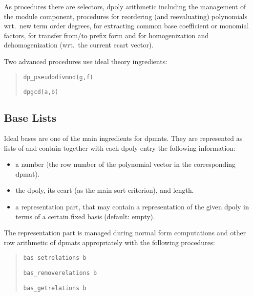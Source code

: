 As procedures there are selectors, dpoly arithmetic including the management
of the module component, procedures for reordering (and reevaluating)
polynomials wrt.\ new term order degrees, for extracting common base
coefficient or monomial factors, for transfer from/to prefix form and for
homogenization and dehomogenization (wrt.\ the current ecart vector).

Two advanced procedures use ideal theory ingredients:
\begin{quote}
\verb|dp_pseudodivmod(g,f)|


\verb|dpgcd(a,b)| 

\end{quote}


\subsection{Base Lists}

Ideal bases are one of the main ingredients for dpmats. They are
represented as lists of  and contain together with
each dpoly entry the following information:
\begin{itemize}
\item a number (the row number of the polynomial vector in the
corresponding dpmat).

\item the dpoly, its ecart (as the main sort criterion), and length.

\item a representation part, that may contain a representation of the
given dpoly in terms of a certain fixed basis (default: empty).
\end{itemize}

The representation part is managed during normal form computations
and other row arithmetic of dpmats appropriately with the following
procedures:
\begin{quote}
\verb|bas_setrelations b|


\verb|bas_removerelations b|


\verb|bas_getrelations b|

\end{quote}

